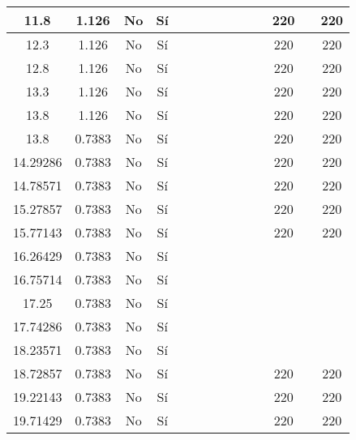 \begin{table}[H]
{\begin{tabular}{|c|c|c|c|c|c|c|c|c|c|c|c|c|c|}
\hline
11.8 & 1.126 & No  & Sí  &     &     &     &     &     &     &     & 220 &     & 220 \bigstrut\\
\hline
12.3 & 1.126 & No  & Sí  &     &     &     &     &     &     &     & 220 &     & 220 \bigstrut\\
\hline
12.8 & 1.126 & No  & Sí  &     &     &     &     &     &     &     & 220 &     & 220 \bigstrut\\
\hline
13.3 & 1.126 & No  & Sí  &     &     &     &     &     &     &     & 220 &     & 220 \bigstrut\\
\hline
13.8 & 1.126 & No  & Sí  &     &     &     &     &     &     &     & 220 &     & 220 \bigstrut\\
\hline
13.8 & 0.7383 & No  & Sí  &     &     &     &     &     &     &     & 220 &     & 220 \bigstrut\\
\hline
14.29286 & 0.7383 & No  & Sí  &     &     &     &     &     &     &     & 220 &     & 220 \bigstrut\\
\hline
14.78571 & 0.7383 & No  & Sí  &     &     &     &     &     &     &     & 220 &     & 220 \bigstrut\\
\hline
15.27857 & 0.7383 & No  & Sí  &     &     &     &     &     &     &     & 220 &     & 220 \bigstrut\\
\hline
15.77143 & 0.7383 & No  & Sí  &     &     &     &     &     &     &     & 220 &     & 220 \bigstrut\\
\hline
16.26429 & 0.7383 & No  & Sí  &     &     &     &     &     &     &     &     &     &  \bigstrut\\
\hline
16.75714 & 0.7383 & No  & Sí  &     &     &     &     &     &     &     &     &     &  \bigstrut\\
\hline
17.25 & 0.7383 & No  & Sí  &     &     &     &     &     &     &     &     &     &  \bigstrut\\
\hline
17.74286 & 0.7383 & No  & Sí  &     &     &     &     &     &     &     &     &     &  \bigstrut\\
\hline
18.23571 & 0.7383 & No  & Sí  &     &     &     &     &     &     &     &     &     &  \bigstrut\\
\hline
18.72857 & 0.7383 & No  & Sí  &     &     &     &     &     &     &     & 220 &     & 220 \bigstrut\\
\hline
19.22143 & 0.7383 & No  & Sí  &     &     &     &     &     &     &     & 220 &     & 220 \bigstrut\\
\hline
19.71429 & 0.7383 & No  & Sí  &     &     &     &     &     &     &     & 220 &     & 220 \bigstrut\\

\end{tabular}}
\end{table}
